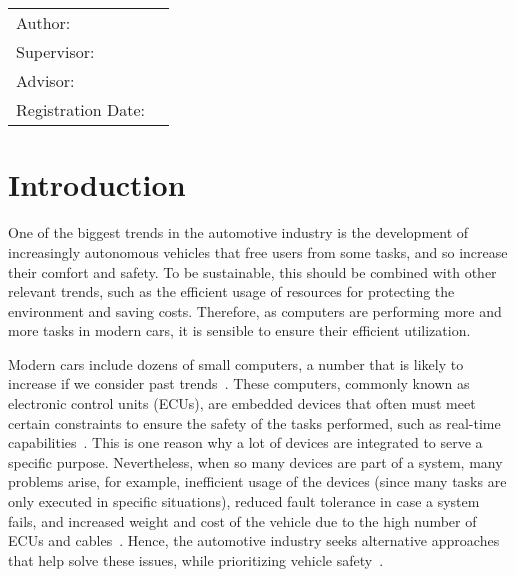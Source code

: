 
\begin{center}

{\Large\MakeUppercase{\getFaculty{}}}\\

\vspace{5mm}
{\large\MakeUppercase{\getUniversity{}}}\\

\vspace{10mm}
{\Large \getDoctype{}}

\vspace{10mm}
{\Large\bfseries \getTitle{}}

\vspace{10mm}
{\Large\bfseries \foreignlanguage{ngerman}{\getTitleGer{}}}

\vspace{15mm}
\begin{tabular}{l l}
	Author:          & \getAuthor{} \\
	Supervisor:      & \getSupervisor{} \\
	Advisor:         & \getAdvisor{} \\
	Registration Date: & \getSubmissionDate{} \\
\end{tabular}

\vspace{20mm}
\end{center}

\section*{Introduction}\label{section:introduction}
One of the biggest trends in the automotive industry is the development of increasingly autonomous vehicles that free users from some tasks, and so increase their comfort and safety. To be sustainable, this should be combined with other relevant trends, such as the efficient usage of resources for protecting the environment and saving costs. Therefore, as computers are performing more and more tasks in modern cars, it is sensible to ensure their efficient utilization.

Modern cars include dozens of small computers, a number that is likely to increase if we consider past trends~\parencite{vipin1, vipin2}. These computers, commonly known as electronic control units (ECUs), are embedded devices that often must meet certain constraints to ensure the safety of the tasks performed, such as real-time capabilities~\parencite{vipin1}. This is one reason why a lot of devices are integrated to serve a specific purpose. Nevertheless, when so many devices are part of a system, many problems arise, for example, inefficient usage of the devices (since many tasks are only executed in specific situations), reduced fault tolerance in case a system fails, and increased weight and cost of the vehicle due to the high number of ECUs and cables~\parencite{vipin2}. Hence, the automotive industry seeks alternative approaches that help solve these issues, while prioritizing vehicle safety~\parencite{mckinsey1}.
 
